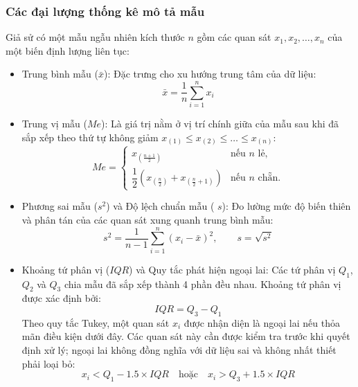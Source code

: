 	\subsubsection{Các đại lượng thống kê mô tả mẫu}
	
	Giả sử có một mẫu ngẫu nhiên kích thước $n$ gồm các quan sát $x_1, x_2, \dots, x_n$ của một biến định lượng liên tục:
	
	\begin{itemize}
		\item Trung bình mẫu ($\bar{x}$): Đặc trưng cho xu hướng trung tâm của dữ liệu:
		\begin{equation}
			\bar{x} = \frac{1}{n} \sum_{i=1}^{n} x_i
		\end{equation}
		\item Trung vị mẫu ($Me$): Là giá trị nằm ở vị trí chính giữa của mẫu sau khi đã sắp xếp theo thứ tự không giảm $x_{(1)} \le x_{(2)} \le \dots \le x_{(n)}$:
		\begin{equation}
			Me = \begin{cases}
				x_{\left(\frac{n+1}{2}\right)} & \text{nếu } n \text{ lẻ}, \\[6pt]
				\dfrac{1}{2}\left(x_{\left(\frac{n}{2}\right)} + x_{\left(\frac{n}{2}+1\right)}\right) & \text{nếu } n \text{ chẵn}.
			\end{cases}
		\end{equation}
		\item Phương sai mẫu ($s^2$) và Độ lệch chuẩn mẫu ( $s$): Đo lường mức độ biến thiên và phân tán của các quan sát xung quanh trung bình mẫu:
		\begin{equation}
			s^2 = \frac{1}{n-1} \sum_{i=1}^{n} (x_i - \bar{x})^2, \qquad s = \sqrt{s^2}
		\end{equation}
		\item Khoảng tứ phân vị ($IQR$) và Quy tắc phát hiện ngoại lai:
		Các tứ phân vị $Q_1$, $Q_2$ và $Q_3$ chia mẫu đã sắp xếp thành 4 phần đều nhau. Khoảng tứ phân vị được xác định bởi:
		\begin{equation}
			IQR = Q_3 - Q_1
		\end{equation}
		Theo quy tắc Tukey, một quan sát $x_i$ được nhận diện là ngoại lai nếu thỏa mãn điều kiện dưới đây. Các quan sát này cần được kiểm tra trước khi quyết định xử lý; ngoại lai không đồng nghĩa với dữ liệu sai và không nhất thiết phải loại bỏ:
		\begin{equation}
			x_i < Q_1 - 1.5 \times IQR \quad \text{hoặc} \quad x_i > Q_3 + 1.5 \times IQR
		\end{equation}
	\end{itemize}
	
